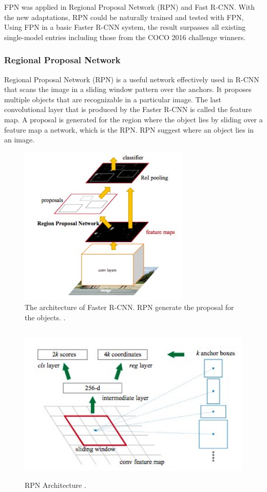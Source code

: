 {FPN was applied in Regional Proposal Network (RPN) and Fast R-CNN. With the new adaptations, RPN could be naturally trained and tested with FPN, Using FPN in a basic Faster R-CNN system, the result surpasses all existing single-model entries including those from the COCO 2016 challenge winners.

\subsubsection{Regional Proposal Network}

Regional Proposal Network (RPN) is a useful network effectively used in R-CNN that scans the image in a sliding window pattern over the anchors.  It proposes multiple objects that are recognizable in a particular image. The last convolutional layer that is produced by the Faster R-CNN is called the feature map. A proposal is generated for the region where the object lies by sliding over a feature map a network, which is the RPN. RPN suggest where an object lies in an image.
\begin{figure}[H]
\centering
  \includegraphics[height=3in]{images/rcnn-rpn.jpg}
   \caption{The architecture of Faster R-CNN. RPN generate the proposal for the objects. \protect\cite{J}.}
\end{figure}

\begin{figure}[H]
\centering
  \includegraphics[height=3in]{images/rpn-arch.jpg}
   \caption{RPN Architecture \protect\cite{J}.}
\end{figure}

}
